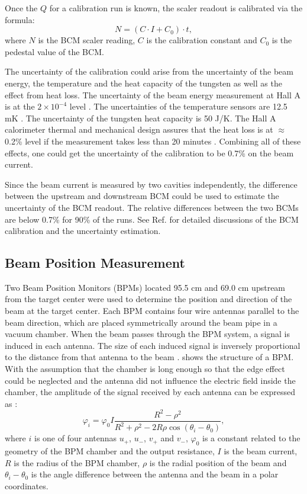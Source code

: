 Once the $Q$ for a calibration run is known, the scaler readout is calibrated via the formula:
\begin{equation} \label{C5S2SS2E2}
N = (C\cdot I+C_0)\cdot t,
\end{equation}
where $N$ is the BCM scaler reading, $C$ is the calibration constant and $C_0$ is the pedestal value of the BCM.

The uncertainty of the calibration could arise from the uncertainty of the beam energy, the temperature and the heat capacity of the tungsten as well as the effect from heat loss. The uncertainty of the beam energy measurement at Hall A is at the $2\times10^{-4}$ level \cite{BEAMENERGY}. The uncertainties of the temperature sensors are 12.5 mK \cite{CALORIMETERLEDEX}. The uncertainty of the tungsten heat capacity is 50 J/K. The Hall A calorimeter thermal and mechanical design assures that the heat loss is at $\approx$ 0.2\% level if the measurement takes less than 20 minutes \cite{Bevins2005}. Combining all of these effects, one could get the uncertainty of the calibration to be 0.7\% on the beam current.

Since the beam current is measured by two cavities independently, the difference between the upstream and downstream BCM could be used to estimate the uncertainty of the BCM readout. The relative differences between the two BCMs are below 0.7\% for 90\% of the runs. See Ref. \cite{Zhu2015} for detailed discussions of the BCM calibration and the uncertainty estimation.

\subsection{Beam Position Measurement}
\label{C5S2SS3}

Two Beam Position Monitors (BPMs) located 95.5 cm and 69.0 cm upstream from the target center were used to determine the position and direction of the beam at the target center. Each BPM contains four wire antennas parallel to the beam direction, which are placed symmetrically around the beam pipe in a vacuum chamber. When the beam passes through the BPM system, a signal is induced in each antenna. The size of each induced signal is inversely proportional to the distance from that antenna to the beam \cite{Barry1991}.  shows the structure of a BPM. With the assumption that the chamber is long enough so that the edge effect could be neglected and the antenna did not influence the electric field inside the chamber, the amplitude of the signal received by each antenna can be expressed as \cite{Piot2005}:
\begin{equation} \label{C5S2SS3E1}
\varphi_i = \varphi_0 I\frac{R^2-\rho^2}{R^2+\rho^2-2R\rho\cos(\theta_i-\theta_0)},
\end{equation}
where $i$ is one of four antennas $u_+$, $u_-$, $v_+$ and $v_-$, $\varphi_0$ is a constant related to the geometry of the BPM chamber and the output resistance, $I$ is the beam current, $R$ is the radius of the BPM chamber, $\rho$ is the radial position of the beam and $\theta_i-\theta_0$ is the angle difference between the antenna and the beam in a polar coordinates.

